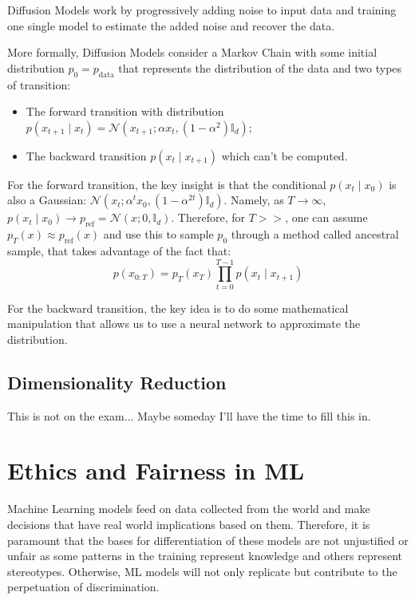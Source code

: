 \documentclass{article}
\begin{document}
Diffusion Models work by progressively adding noise to input data and training one single model to estimate the added noise and recover the data.

More formally, Diffusion Models consider a Markov Chain with some initial distribution $p_0 = p_\text{data}$ that represents the distribution of the data and two types of transition:
\begin{itemize}
    \item The forward transition with distribution $p(x_{t+1} \mid x_t) = \mathcal{N}(x_{t+1} ; \alpha x_t, (1-\alpha^2) \mathbb{I}_d)$;
    \item The backward transition $p(x_t \mid x_{t+1})$ which can't be computed.
\end{itemize}

For the forward transition, the key insight is that the conditional $p(x_t \mid x_0)$ is also a Gaussian: $\mathcal{N}(x_t ; \alpha^t x_0, (1-\alpha^{2t}) \mathbb{I}_d)$.
Namely, as $T \to \infty$, $p(x_t \mid x_0) \to p_\text{ref} = \mathcal{N}(x ; 0, \mathbb{I}_d)$.
Therefore, for $T >>$, one can assume $p_T(x) \approx p_\text{ref}(x)$ and use this to sample $p_0$ through a method called ancestral sample, that takes advantage of the fact that:
$$
p(x_{0:T}) = p_T(x_T) \prod_{t=0}^{T-1} p(x_t \mid x_{t+1})
$$

For the backward transition, the key idea is to do some mathematical manipulation that allows us to use a neural network to approximate the distribution.

\subsection{Dimensionality Reduction}

This is not on the exam... Maybe someday I'll have the time to fill this in.

\section{Ethics and Fairness in ML}

Machine Learning models feed on data collected from the world and make decisions that have real world implications based on them.
Therefore, it is paramount that the bases for differentiation of these models are not unjustified or unfair as some patterns in the training represent knowledge and others represent stereotypes.
Otherwise, ML models will not only replicate but contribute to the perpetuation of discrimination.
\end{document}
